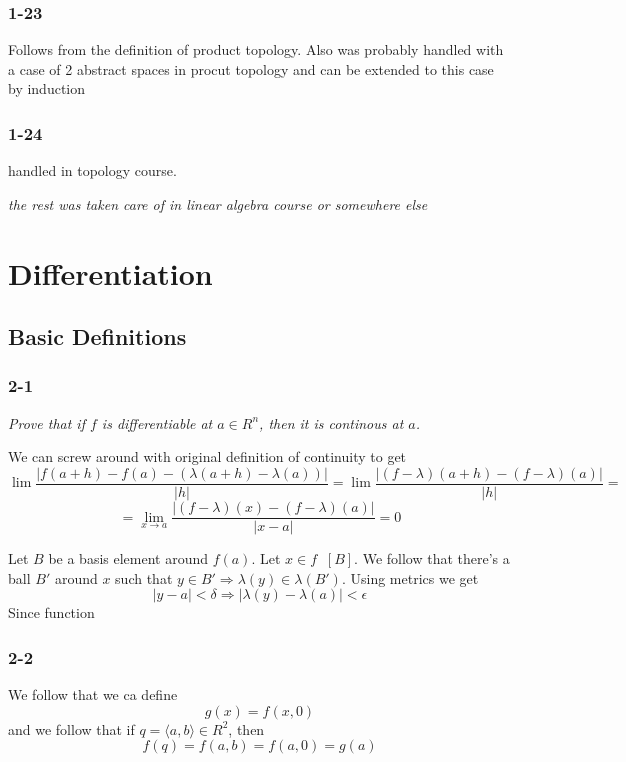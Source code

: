 \documentclass[11pt,oneside,titlepage]{book}
\DeclareMathOperator \inv {^{-1}}
\DeclareMathOperator \ra {\Rightarrow}
\newcommand{\eangle}[1]{\langle #1 \rangle}
\begin{document}
\subsection*{1-23}

Follows from the definition of product topology. Also was probably handled with a case
of 2 abstract spaces in procut topology and can be extended to this case
by induction

\subsection*{1-24}

handled in topology course.

\textit{ the rest was taken care of in linear algebra course or somewhere else}

\chapter{Differentiation}

\section{Basic Definitions}

\subsection*{2-1}

\textit{Prove that if $f$ is differentiable at $a \in R^n$, then it is continous at $a$.}

We can screw around with original definition of continuity to get
$$\lim \frac{|f(a + h) - f(a) - (\lambda(a + h) - \lambda(a))|}{|h|} =
\lim \frac{|(f - \lambda)(a + h) - (f - \lambda)(a)|}{|h|} = $$
$$ = \lim_{x \to a}
\frac{|(f - \lambda)(x) - (f - \lambda)(a)|}{|x - a|} = 0$$

Let $B$ be a basis element around $f(a)$. Let $x \in f\inv[B]$. We follow that there's
a ball $B'$ around $x$ such that $y \in B' \ra \lambda(y) \in \lambda(B')$.
Using metrics we get
$$|y - a| < \delta \ra |\lambda(y) - \lambda(a)| < \epsilon$$
Since function 

\subsection*{2-2}

We follow that we ca define
$$g(x) = f(x, 0)$$
and we follow that if $q = \eangle{a, b} \in R^2$, then
$$f(q) = f(a, b) = f(a, 0) = g(a)$$
\end{document}
